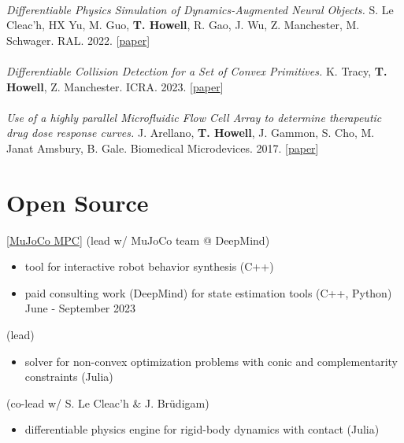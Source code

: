 \documentclass[10pt]{article}
\begin{document}
\\
\textit{Differentiable Physics Simulation of Dynamics-Augmented Neural Objects.} {\color{lightgray} S. Le Cleac'h, HX Yu, M. Guo, }\textbf{T. Howell}{\color{lightgray}, R. Gao, J. Wu, Z. Manchester, M. Schwager. RAL. 2022.}
[\href{https://arxiv.org/pdf/2210.09420.pdf}{paper}]
\\
\\
\textit{Differentiable Collision Detection for a Set of Convex Primitives.} {\color{lightgray} K. Tracy,} \textbf{T. Howell}{\color{lightgray}, Z. Manchester. ICRA. 2023.}
[\href{https://arxiv.org/abs/2207.00669}{paper}]
\\
\\
\textit{Use of a highly parallel Microfluidic Flow Cell Array to determine therapeutic drug dose response curves.} {\color{lightgray} J. Arellano, }\textbf{T. Howell}{\color{lightgray}, J. Gammon, S. Cho, M. Janat Amsbury, B. Gale. Biomedical Microdevices. 2017.}
[\href{https://link.springer.com/article/10.1007/s10544-017-0166-3}{paper}]

\section*{Open Source}

[\href{https://github.com/deepmind/mujoco_mpc}{MuJoCo MPC}] (lead w/ MuJoCo team @ DeepMind)
\begin{itemize}
    \item {\color{lightgray} tool for interactive robot behavior synthesis (C++)}
    \item {\color{lightgray} paid consulting work (DeepMind) for state estimation tools (C++, Python) \hfill June - September 2023}
\end{itemize}

 (lead)
\begin{itemize}
\item {\color{lightgray} solver for non-convex optimization problems with conic and complementarity constraints (Julia)}
\end{itemize}

 (co-lead w/ S. Le Cleac'h \& J. Brüdigam)
\begin{itemize}
\item {\color{lightgray} differentiable physics engine for rigid-body dynamics with contact (Julia)}
\end{itemize}
\end{document}
